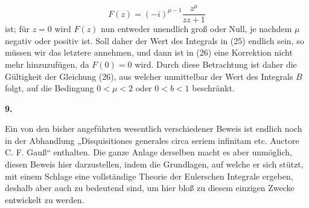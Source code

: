 \documentclass[11pt]{article}
\newcommand{\art}[1]{\bigskip\begin{center}\large\bfseries #1.\end{center}\nopagebreak}
\begin{document}
\[
F(z)=(-i)^{\mu-1}\frac{z^\mu}{zz+1}
\]
ist; für $z=0$ wird $F(z)$ nun entweder unendlich groß oder Null, je nachdem $\mu$ negativ oder positiv ist. Soll daher der Wert des Integrals in (25) endlich sein, so müssen wir das letztere annehmen, und dann ist in (26) eine Korrektion nicht mehr hinzuzufügen, da $F(0)=0$ wird. Durch diese Betrachtung ist daher die Gültigkeit der Gleichung (26), aus welcher unmittelbar der Wert des Integrals $B$ folgt, auf die Bedingung $0<\mu<2$ oder $0<b<1$ beschränkt.

\art{9}

Ein von den bisher angeführten wesentlich verschiedener Beweis ist endlich noch in der Abhandlung „Disquisitiones generales circa seriem infinitam etc. Auctore C. F. Gauß“ enthalten. Die ganze Anlage derselben macht es aber unmöglich, diesen Beweis hier darzustellen, indem die Grundlagen, auf welche er sich stützt, mit einem Schlage eine vollständige Theorie der Eulerschen Integrale ergeben, deshalb aber auch zu bedeutend sind, um hier bloß zu diesem einzigen Zwecke entwickelt zu werden.
\end{document}
